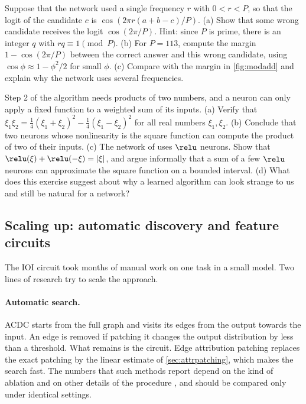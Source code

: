 \begin{exercise}\label{ex:onefreq}
Suppose that the network used a single frequency $r$ with $0<r<P$, so that the logit of the candidate $c$ is
$\cos(2\pi r(a+b-c)/P)$. (a) Show that some wrong candidate receives the logit $\cos(2\pi/P)$. Hint: since $P$ is
prime, there is an integer $q$ with $rq\equiv1\pmod P$. (b) For $P=113$, compute the margin $1-\cos(2\pi/P)$
between the correct answer and this wrong candidate, using $\cos\phi\approx1-\phi^2/2$ for small $\phi$.
(c) Compare with the margin in \cref{fig:modadd} and explain why the network uses several frequencies.
\end{exercise}

\begin{exercise}\label{ex:product}
Step 2 of the algorithm needs products of two numbers, and a neuron can only apply a fixed function to a
weighted sum of its inputs. (a) Verify that $\xi_1\xi_2=\tfrac14(\xi_1+\xi_2)^2-\tfrac14(\xi_1-\xi_2)^2$ for all
real numbers $\xi_1,\xi_2$. (b) Conclude that two neurons whose nonlinearity is the square function can compute the
product of two of their inputs. (c) The network of \citet{nanda2023progress} uses $\relu$ neurons. Show that
$\relu(\xi)+\relu(-\xi)=|\xi|$, and argue informally that a sum of a few $\relu$ neurons can approximate the
square function on a bounded interval. (d) What does this exercise suggest about why a learned algorithm can look
strange to us and still be natural for a network?
\end{exercise}

\subsection{Scaling up: automatic discovery and feature circuits}
\label{sec:featurecircuits}

The IOI circuit took months of manual work on one task in a small model. Two lines of research try to scale
the approach.

\paragraph{Automatic search.} ACDC \citep{conmy2023towards} starts from the full graph and visits its edges
from the output towards the input. An edge is removed if patching it changes the output distribution by less
than a threshold. What remains is the circuit. Edge attribution patching \citep{syed2024attribution} replaces
the exact patching by the linear estimate of \cref{sec:attrpatching}, which makes the search fast. The
numbers that such methods report depend on the kind of ablation and on other details of the procedure
\citep{miller2024transformer}, and should be compared only under identical settings.

